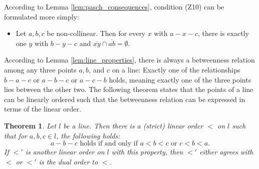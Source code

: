 \documentclass[11pt,a4paper]{article}
\newcommand{\betw}[3]{#1 - #2 - #3}
\newcommand{\lineab}[1]{\overline{#1}}
\newtheorem{theorem}{Theorem}[section]
\begin{document}
According to Lemma \ref{lem:pasch_consequences}, condition (Z10) can be formulated more simply:
\begin{itemize}
    \item[(Z10')] Let $a, b, c$ be non-collinear. Then for every $x$ with $\betw{a}{x}{c}$, there is exactly one $y$ with $\betw{b}{y}{c}$ and $\lineab{xy} \cap \lineab{ab} = \emptyset$.
\end{itemize}

According to Lemma \ref{lem:line_properties}, there is always a betweenness relation among any three points $a, b$, and $c$ on a line: Exactly one of the relationships $\betw{b}{a}{c}$ or $\betw{a}{b}{c}$ or $\betw{a}{c}{b}$ holds, meaning exactly one of the three points lies between the other two. The following theorem states that the points of a line can be linearly ordered such that the betweenness relation can be expressed in terms of the linear order.

\begin{theorem} \label{thm:line_linear_order}
Let $l$ be a line. Then there is a (strict) linear order $<$ on $l$ such that for $a, b, c \in l$, the following holds:
\begin{equation} \label{eq:line_order}
    \betw{a}{b}{c} \text{ holds if and only if } a < b < c \text{ or } c < b < a.
\end{equation}
If $<'$ is another linear order on $l$ with this property, then $<'$ either agrees with $<$ or $<'$ is the dual order to $<$.
\end{theorem}
\end{document}
